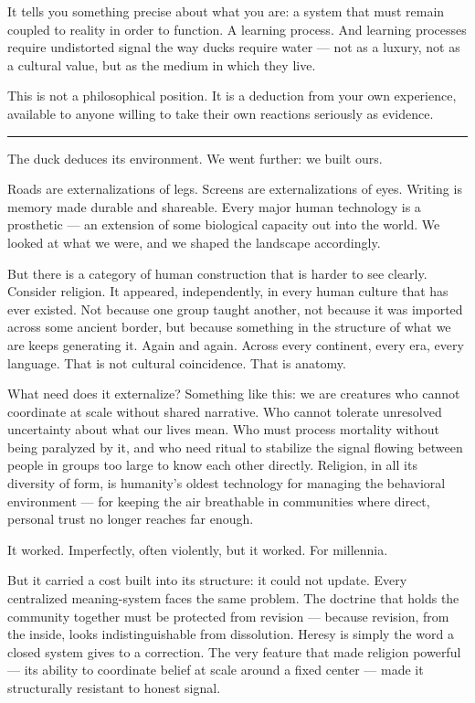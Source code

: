 \documentclass[12pt,letterpaper]{article}
\begin{document}
It tells you something precise about what you are: a system that must remain coupled to reality in order to function. A learning process. And learning processes require undistorted signal the way ducks require water — not as a luxury, not as a cultural value, but as the medium in which they live.

This is not a philosophical position. It is a deduction from your own experience, available to anyone willing to take their own reactions seriously as evidence.

\begin{center}
\rule{\textwidth}{0.4pt}
\end{center}

The duck deduces its environment. We went further: we built ours.

Roads are externalizations of legs. Screens are externalizations of eyes. Writing is memory made durable and shareable. Every major human technology is a prosthetic — an extension of some biological capacity out into the world. We looked at what we were, and we shaped the landscape accordingly.

But there is a category of human construction that is harder to see clearly. Consider religion. It appeared, independently, in every human culture that has ever existed. Not because one group taught another, not because it was imported across some ancient border, but because something in the structure of what we are keeps generating it. Again and again. Across every continent, every era, every language. That is not cultural coincidence. That is anatomy.

What need does it externalize? Something like this: we are creatures who cannot coordinate at scale without shared narrative. Who cannot tolerate unresolved uncertainty about what our lives mean. Who must process mortality without being paralyzed by it, and who need ritual to stabilize the signal flowing between people in groups too large to know each other directly. Religion, in all its diversity of form, is humanity's oldest technology for managing the behavioral environment — for keeping the air breathable in communities where direct, personal trust no longer reaches far enough.

It worked. Imperfectly, often violently, but it worked. For millennia.

But it carried a cost built into its structure: it could not update. Every centralized meaning-system faces the same problem. The doctrine that holds the community together must be protected from revision — because revision, from the inside, looks indistinguishable from dissolution. Heresy is simply the word a closed system gives to a correction. The very feature that made religion powerful — its ability to coordinate belief at scale around a fixed center — made it structurally resistant to honest signal.
\end{document}
